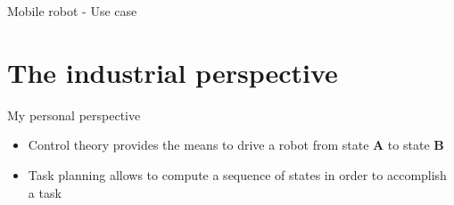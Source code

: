 \documentclass[usenames,dvipsnames,xcolor=table]{beamer}
\begin{document}
\begin{frame}{Mobile robot - Use case}
    \begin{center}
    \end{center}
\end{frame}


	


\section{The industrial perspective}


\begin{frame}{My personal perspective}

\begin{itemize}
    \item Control theory provides the means to drive a robot from state \textbf{A} to state \textbf{B}
    \item Task planning allows to compute a sequence of states in order to accomplish a task
\end{itemize}

\end{frame}

\end{document}
